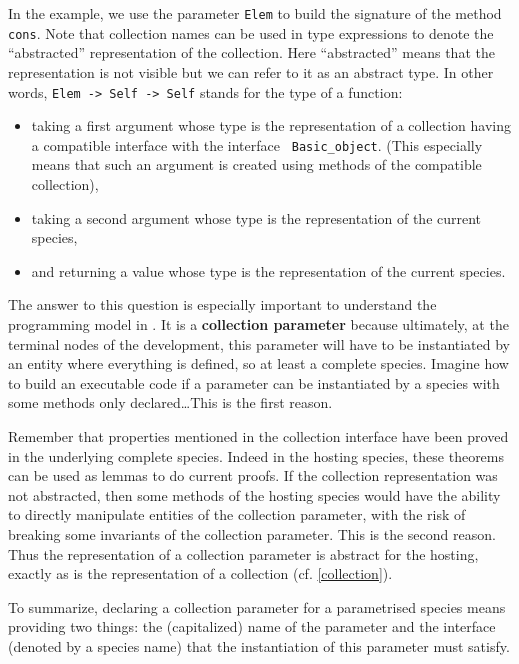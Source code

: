 \smallskip
In the example, we use the parameter {\tt Elem} to build the signature
of the method {\tt cons}. Note that collection names can be used
in type expressions to denote the ``abstracted'' representation of the
collection. Here ``abstracted'' means that the
representation is not visible but we can refer to it
as an abstract type. In other words, {\tt Elem -> Self -> Self}
stands for the type of a function:
\begin{itemize}
\item taking a first argument whose type is the representation  of a
  collection having a compatible interface with the interface {\tt
    Basic\_object}. (This especially means that such an argument is
  created using methods of the compatible collection),
  \item taking a second argument whose type is the representation of
    the current species,
  \item and returning a value whose type is the representation  of the
    current species.
\end{itemize}


The answer to this question is especially important to
understand the programming model in {\focal}. It is a {\bf collection
parameter} because ultimately, at the terminal nodes of the
development, this parameter will have to be instantiated by an entity
where everything is defined, so at least a complete species. Imagine
how to build an executable code if a parameter can be instantiated by
a species with some methods only declared\ldots This is the first
reason.

Remember that properties mentioned in the collection interface have
been proved in the underlying complete species. Indeed in the hosting
species, these theorems can be used as lemmas to do current proofs. If
the collection representation was not abstracted, then some methods of
the hosting species would have the ability to directly manipulate
entities of the collection parameter, with the risk of breaking some
invariants of the collection parameter.  This is the second reason.
Thus the representation of a collection parameter is abstract for the
hosting, exactly as is the representation of a collection (cf.
\ref{collection}).

To summarize, declaring a collection parameter for a parametrised
species means providing two things: the (capitalized) name of the
parameter and the interface (denoted by a species name) that the
instantiation of this parameter must satisfy.


